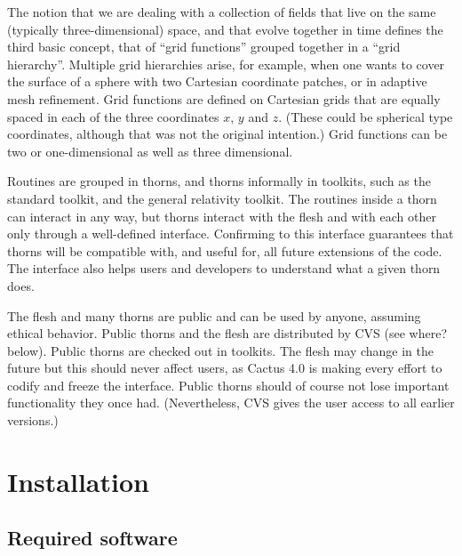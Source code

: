 The notion that we are dealing with a collection of fields that live
on the same (typically three-dimensional) space, and that evolve
together in time defines the third basic concept, that of ``grid
functions'' grouped together in a ``grid hierarchy''. Multiple
grid hierarchies arise, for example, when one wants to cover the
surface of a sphere with two Cartesian coordinate patches, or in
adaptive mesh refinement.  Grid functions are defined on Cartesian
grids that are equally spaced in each of the three coordinates $x$,
$y$ and $z$. (These could be spherical type coordinates, although that
was not the original intention.) Grid functions can be two or
one-dimensional as well as three dimensional.

Routines are grouped in thorns, and thorns informally in toolkits,
such as the standard toolkit, and the general relativity
toolkit. The routines inside a thorn can interact in any way, but
thorns interact with the flesh and with each other only through a
well-defined interface. Confirming to this interface guarantees that
thorns will be compatible with, and useful for, all future extensions
of the code. The interface also helps users and developers to
understand what a given thorn does. 

The flesh and many thorns are public and can be used by anyone,
assuming ethical behavior. Public thorns and the flesh are distributed
by CVS (see {\q where?} below). Public thorns are checked out in
toolkits. The flesh may change in the future but this should never
affect users, as Cactus 4.0 is making every effort to codify and
freeze the interface. Public thorns should of course not lose
important functionality they once had. (Nevertheless, CVS gives the
user access to all earlier versions.)


\chapter{Installation} 


\section{Required software}

